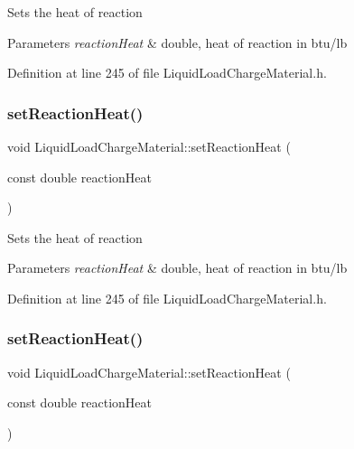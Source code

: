 Sets the heat of reaction 
\begin{DoxyParams}{Parameters}
{\em reaction\+Heat} & double, heat of reaction in btu/lb \\
\hline
\end{DoxyParams}


Definition at line 245 of file Liquid\+Load\+Charge\+Material.\+h.

\mbox{\label{class_liquid_load_charge_material_a793c7ebc2643b2af0eaf21b9cb788775}} 
\subsubsection{\texorpdfstring{set\+Reaction\+Heat()}{setReactionHeat()}\hspace{0.1cm}{\footnotesize\ttfamily [2/3]}}
{\footnotesize\ttfamily void Liquid\+Load\+Charge\+Material\+::set\+Reaction\+Heat (\begin{DoxyParamCaption}\item[{const double}]{reaction\+Heat }\end{DoxyParamCaption})\hspace{0.3cm}{\ttfamily [inline]}}

Sets the heat of reaction 
\begin{DoxyParams}{Parameters}
{\em reaction\+Heat} & double, heat of reaction in btu/lb \\
\hline
\end{DoxyParams}


Definition at line 245 of file Liquid\+Load\+Charge\+Material.\+h.

\mbox{\label{class_liquid_load_charge_material_a793c7ebc2643b2af0eaf21b9cb788775}} 
\subsubsection{\texorpdfstring{set\+Reaction\+Heat()}{setReactionHeat()}\hspace{0.1cm}{\footnotesize\ttfamily [3/3]}}
{\footnotesize\ttfamily void Liquid\+Load\+Charge\+Material\+::set\+Reaction\+Heat (\begin{DoxyParamCaption}\item[{const double}]{reaction\+Heat }\end{DoxyParamCaption})\hspace{0.3cm}{\ttfamily [inline]}}

